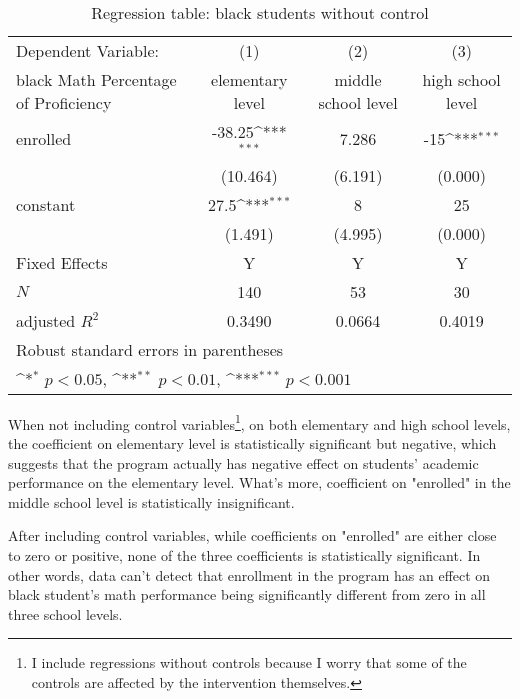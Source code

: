 \begin{table}[H]\centering
\def\sym#1{\ifmmode^{#1}\else\(^{#1}\)\fi}
\caption{Regression table: black students without control\label{tab1}}
\begin{tabular}{l*{3}{c}}
\hline\hline
  Dependent Variable: &\multicolumn{1}{c}{(1)}&\multicolumn{1}{c}{(2)}&\multicolumn{1}{c}{(3)}\\
black Math Percentage of Proficiency            &\multicolumn{1}{c}{elementary level}&\multicolumn{1}{c}{middle school level}&\multicolumn{1}{c}{high school level}\\
\hline
enrolled    &      -38.25\sym{***}         &       7.286         &      -15\sym{***} \\
            &     (10.464)         &     (6.191)         &     (0.000)         \\
[1em]
constant      &       27.5\sym{***}&       8&       25\\
            &     (1.491)         &     (4.995)         &     (0.000)         \\
\hline
Fixed Effects   &    Y     &Y&Y \\
\hline
\(N\)       &         140         &          53         &          30         \\
adjusted \(R^{2}\)&       0.3490         &       0.0664         &       0.4019         \\
\hline\hline
\multicolumn{4}{l}{\footnotesize Robust standard errors in parentheses}\\
\multicolumn{4}{l}{\footnotesize \sym{*} \(p<0.05\), \sym{**} \(p<0.01\), \sym{***} \(p<0.001\)}\\
\end{tabular}
\end{table}

When not including control variables\footnote{I include regressions without controls because I worry that some of the controls are affected by the intervention themselves.}, on both elementary and high school levels, the coefficient on elementary level is statistically significant but negative, which suggests that the program actually has negative effect on students' academic performance on the elementary level. What's more, coefficient on "enrolled" in the middle school level is statistically insignificant.

After including control variables, while coefficients on "enrolled" are either close to zero or positive, none of the three coefficients is statistically significant. In other words, data can't detect that enrollment in the program has an effect on black student's math performance being significantly different from zero in all three school levels.

